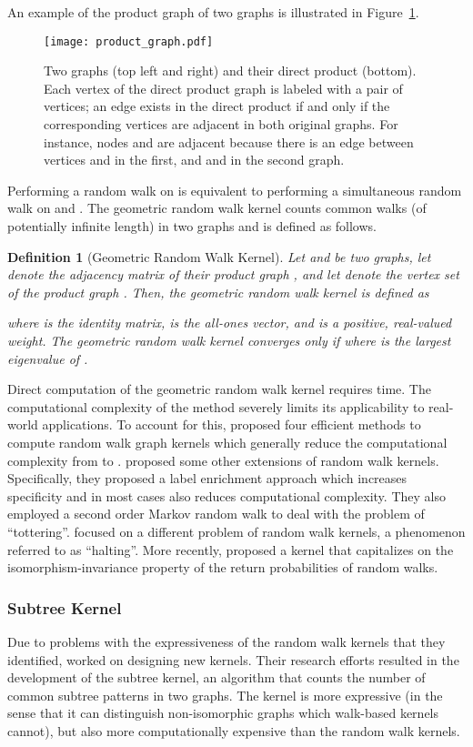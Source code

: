 \documentclass[twoside,11pt]{article}
\newtheorem{definition}{Definition}
\begin{document}
An example of the product graph of two graphs is illustrated in Figure~\ref{fig:product_graph}.
\begin{figure}[t]
    \centering
    \texttt{[image: product\_graph.pdf]}
    \caption{Two graphs (top left and right) and their direct product (bottom). Each vertex of the direct product graph is labeled with a pair of vertices; an edge exists in the direct product if and only if the corresponding vertices are adjacent in both original graphs. For instance, nodes  and  are adjacent because there is an edge between vertices  and  in the first, and  and  in the second graph.}
    \label{fig:product_graph}
\end{figure}
Performing a random walk on  is equivalent to performing a simultaneous random walk on  and .
The geometric random walk kernel counts common walks (of potentially infinite length) in two graphs and is defined as follows.  
\begin{definition}[Geometric Random Walk Kernel]
  Let  and  be two graphs, let  denote the adjacency matrix of their product graph , and let  denote the vertex set of the product graph .
  Then, the geometric random walk kernel is defined as
  
  where  is the identity matrix,  is the all-ones vector, and  is a positive, real-valued weight.
  The geometric random walk kernel converges only if  where  is the largest eigenvalue of .
\end{definition}
Direct computation of the geometric random walk kernel requires  time.
The computational complexity of the method severely limits its applicability to real-world applications.
To account for this,  proposed four efficient methods to compute random walk graph kernels which generally reduce the computational complexity from  to .
 proposed some other extensions of random walk kernels.
Specifically, they proposed a label enrichment approach which increases specificity and in most cases also reduces computational complexity.
They also employed a second order Markov random walk to deal with the problem of ``tottering''.
 focused on a different problem of random walk kernels, a phenomenon referred to as ``halting''.
More recently,  proposed a kernel that capitalizes on the isomorphism-invariance property of the return probabilities of random walks.

\subsubsection{Subtree Kernel}
Due to problems with the expressiveness of the random walk kernels that they identified,  worked on designing new kernels.
Their research efforts resulted in the development of the subtree kernel, an algorithm that counts the number of common subtree patterns in two graphs.
The kernel is more expressive (in the sense that it can distinguish non-isomorphic graphs which walk-based kernels cannot), but also more computationally expensive than the random walk kernels.
\end{document}

